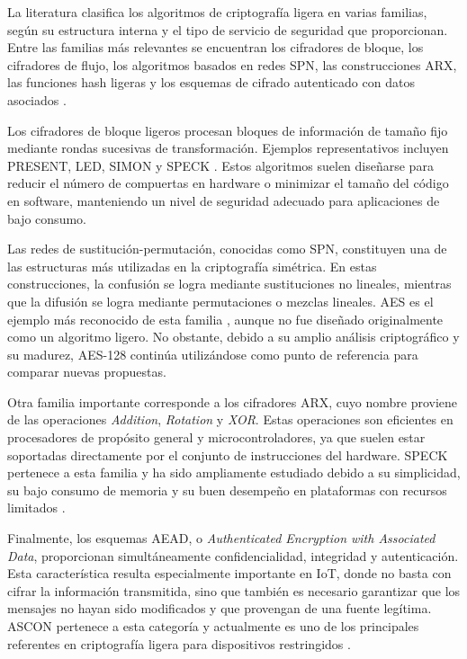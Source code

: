 La literatura clasifica los algoritmos de criptografía ligera en varias familias, según su estructura interna y el tipo de servicio de seguridad que proporcionan. Entre las familias más relevantes se encuentran los cifradores de bloque, los cifradores de flujo, los algoritmos basados en redes SPN, las construcciones ARX, las funciones hash ligeras y los esquemas de cifrado autenticado con datos asociados \cite{Dhanda2020LightweightIoT}.

Los cifradores de bloque ligeros procesan bloques de información de tamaño fijo mediante rondas sucesivas de transformación. Ejemplos representativos incluyen PRESENT, LED, SIMON y SPECK \cite{Bogdanov2007PRESENT:Cipher,Beaulieu2015TheCiphers}. Estos algoritmos suelen diseñarse para reducir el número de compuertas en hardware o minimizar el tamaño del código en software, manteniendo un nivel de seguridad adecuado para aplicaciones de bajo consumo.

Las redes de sustitución-permutación, conocidas como SPN, constituyen una de las estructuras más utilizadas en la criptografía simétrica. En estas construcciones, la confusión se logra mediante sustituciones no lineales, mientras que la difusión se logra mediante permutaciones o mezclas lineales. AES es el ejemplo más reconocido de esta familia \cite{NationalInstituteofStandards2001AdvancedAES}, aunque no fue diseñado originalmente como un algoritmo ligero. No obstante, debido a su amplio análisis criptográfico y su madurez, AES-128 continúa utilizándose como punto de referencia para comparar nuevas propuestas.

Otra familia importante corresponde a los cifradores ARX, cuyo nombre proviene de las operaciones \textit{Addition}, \textit{Rotation} y \textit{XOR}. Estas operaciones son eficientes en procesadores de propósito general y microcontroladores, ya que suelen estar soportadas directamente por el conjunto de instrucciones del hardware. SPECK pertenece a esta familia y ha sido ampliamente estudiado debido a su simplicidad, su bajo consumo de memoria y su buen desempeño en plataformas con recursos limitados \cite{Beaulieu2015TheCiphers}.

Finalmente, los esquemas AEAD, o \textit{Authenticated Encryption with Associated Data}, proporcionan simultáneamente confidencialidad, integridad y autenticación. Esta característica resulta especialmente importante en IoT, donde no basta con cifrar la información transmitida, sino que también es necesario garantizar que los mensajes no hayan sido modificados y que provengan de una fuente legítima. ASCON pertenece a esta categoría y actualmente es uno de los principales referentes en criptografía ligera para dispositivos restringidos \cite{NationalInstituteofStandards2023AnnouncingSelection,Turan2025Ascon-BasedFunctions}.

